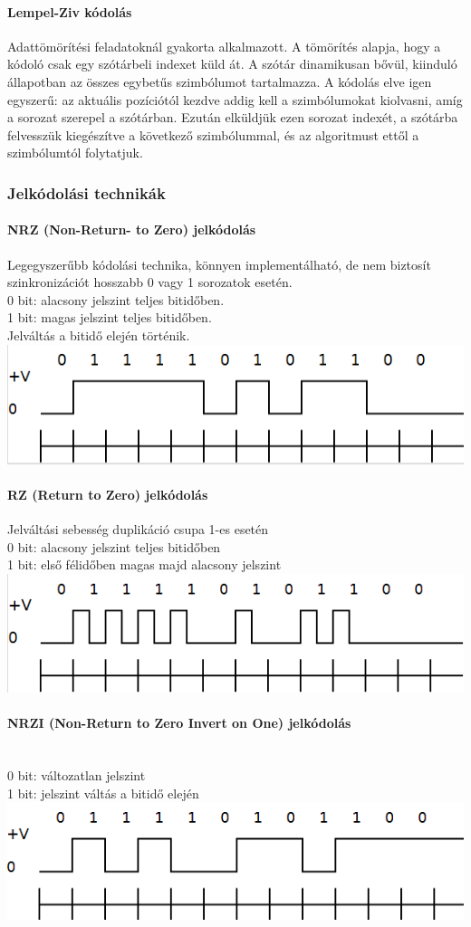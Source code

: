 \paragraph{Lempel-Ziv kódolás}
Adattömörítési feladatoknál gyakorta alkalmazott. A tömörítés alapja, hogy a kódoló csak egy szótárbeli indexet küld át. A szótár dinamikusan bővül, kiinduló állapotban az összes egybetűs szimbólumot tartalmazza. A kódolás elve igen egyszerű: az aktuális pozíciótól kezdve addig kell a szimbólumokat kiolvasni, amíg a sorozat szerepel a szótárban. Ezután elküldjük ezen sorozat indexét, a szótárba felvesszük kiegészítve a következő szimbólummal, és az algoritmust ettől a szimbólumtól folytatjuk.


\subsubsection{Jelkódolási technikák}
\paragraph{NRZ (Non-Return- to Zero) jelkódolás} Legegyszerűbb kódolási technika, könnyen implementálható, de nem biztosít szinkronizációt hosszabb 0 vagy 1 sorozatok esetén.\\
0 bit: alacsony jelszint teljes bitidőben.\\ 1 bit: magas jelszint teljes bitidőben.\\ Jelváltás a bitidő elején történik.
\includegraphics[width=0.35\linewidth]{fig/12-NRZ}

\paragraph{RZ (Return to Zero) jelkódolás} Jelváltási sebesség duplikáció csupa 1-es esetén\\
0 bit: alacsony jelszint teljes bitidőben\\
1 bit: első félidőben magas majd alacsony jelszint\\
\includegraphics[width=0.35\linewidth]{fig/12-RZ}

\paragraph{NRZI (Non-Return to Zero Invert on One) jelkódolás}~\\
0 bit: változatlan jelszint\\
1 bit: jelszint váltás a bitidő elején\\
\includegraphics[width=0.35\linewidth]{fig/12-NRZ1}


